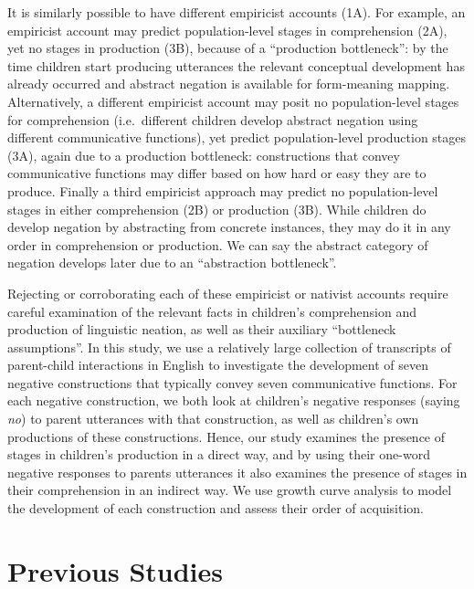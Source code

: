 \documentclass[
  man,floatsintext]{apa6}
\begin{document}
It is similarly possible to have different empiricist accounts (1A). For example, an empiricist account may predict population-level stages in comprehension (2A), yet no stages in production (3B), because of a ``production bottleneck'': by the time children start producing utterances the relevant conceptual development has already occurred and abstract negation is available for form-meaning mapping. Alternatively, a different empiricist account may posit no population-level stages for comprehension (i.e.~different children develop abstract negation using different communicative functions), yet predict population-level production stages (3A), again due to a production bottleneck: constructions that convey communicative functions may differ based on how hard or easy they are to produce. Finally a third empiricist approach may predict no population-level stages in either comprehension (2B) or production (3B). While children do develop negation by abstracting from concrete instances, they may do it in any order in comprehension or production. We can say the abstract category of negation develops later due to an ``abstraction bottleneck''.

Rejecting or corroborating each of these empiricist or nativist accounts require careful examination of the relevant facts in children's comprehension and production of linguistic neation, as well as their auxiliary ``bottleneck assumptions''. In this study, we use a relatively large collection of transcripts of parent-child interactions in English to investigate the development of seven negative constructions that typically convey seven communicative functions. For each negative construction, we both look at children's negative responses (saying \emph{no}) to parent utterances with that construction, as well as children's own productions of these constructions. Hence, our study examines the presence of stages in children's production in a direct way, and by using their one-word negative responses to parents utterances it also examines the presence of stages in their comprehension in an indirect way. We use growth curve analysis to model the development of each construction and assess their order of acquisition.

\section{Previous Studies}\label{previous-studies}
\end{document}
